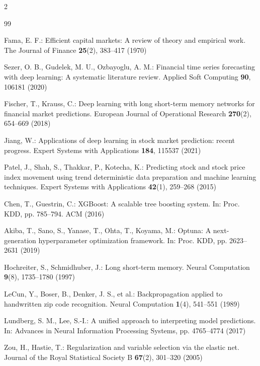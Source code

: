 \documentclass[runningheads]{llncs}
\begin{document}
{\footnotesize
\setlength{\columnsep}{12pt}
\begin{multicols}{2}
\begin{thebibliography}{99}
\setlength{\itemsep}{0.5pt plus 0.5pt minus 0.5pt}
\setlength{\parskip}{0pt}
\raggedright

Fama, E. F.: Efficient capital markets: A review of theory and empirical work. The Journal of Finance \textbf{25}(2), 383--417 (1970)

Sezer, O. B., Gudelek, M. U., Ozbayoglu, A. M.: Financial time series forecasting with deep learning: A systematic literature review. Applied Soft Computing \textbf{90}, 106181 (2020)

Fischer, T., Krauss, C.: Deep learning with long short-term memory networks for financial market predictions. European Journal of Operational Research \textbf{270}(2), 654--669 (2018)

Jiang, W.: Applications of deep learning in stock market prediction: recent progress. Expert Systems with Applications \textbf{184}, 115537 (2021)

Patel, J., Shah, S., Thakkar, P., Kotecha, K.: Predicting stock and stock price index movement using trend deterministic data preparation and machine learning techniques. Expert Systems with Applications \textbf{42}(1), 259--268 (2015)

Chen, T., Guestrin, C.: XGBoost: A scalable tree boosting system. In: Proc. KDD, pp. 785--794. ACM (2016)

Akiba, T., Sano, S., Yanase, T., Ohta, T., Koyama, M.: Optuna: A next-generation hyperparameter optimization framework. In: Proc. KDD, pp. 2623--2631 (2019)

Hochreiter, S., Schmidhuber, J.: Long short-term memory. Neural Computation \textbf{9}(8), 1735--1780 (1997)

LeCun, Y., Boser, B., Denker, J. S., et al.: Backpropagation applied to handwritten zip code recognition. Neural Computation \textbf{1}(4), 541--551 (1989)

Lundberg, S. M., Lee, S.-I.: A unified approach to interpreting model predictions. In: Advances in Neural Information Processing Systems, pp. 4765--4774 (2017)

Zou, H., Hastie, T.: Regularization and variable selection via the elastic net. Journal of the Royal Statistical Society B \textbf{67}(2), 301--320 (2005)


\end{thebibliography}
\end{multicols}}
\end{document}
